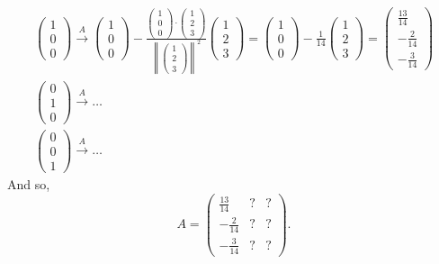 \documentclass[12pt]{article}
\newcommand{\norm}[1]{\left\lVert#1\right\rVert}
\begin{document}
\begin{gather*}
	\begin{pmatrix} 1 \\ 0 \\ 0 \end{pmatrix}
	\overset{A}{\longrightarrow}
	\begin{pmatrix} 1 \\ 0 \\ 0 \end{pmatrix}
	-
	\frac{
		\begin{pmatrix} 1 \\ 0 \\ 0 \end{pmatrix}
		\cdot
		\begin{pmatrix} 1 \\ 2 \\ 3 \end{pmatrix}
	}{
		\norm{\begin{pmatrix} 1 \\ 2 \\ 3 \end{pmatrix}}^2
	}
	\begin{pmatrix} 1 \\ 2 \\ 3 \end{pmatrix}
	=
	\begin{pmatrix} 1 \\ 0 \\ 0 \end{pmatrix}
	-
	\frac{1}{14}
	\begin{pmatrix} 1 \\ 2 \\ 3 \end{pmatrix}
	=
	\begin{pmatrix}
		\frac{13}{14} \\ -\frac{2}{14} \\ -\frac{3}{14}
	\end{pmatrix}
	\\
	\begin{pmatrix} 0 \\ 1 \\ 0 \end{pmatrix}
	\overset{A}{\longrightarrow}
	\ldots
	\\
	\begin{pmatrix} 0 \\ 0 \\ 1 \end{pmatrix}
	\overset{A}{\longrightarrow}
	\ldots
\end{gather*}
And so,
\begin{equation*}
	\boxed{
		A =
		\begin{pmatrix}
			\frac{13}{14} & ? & ? \\
			-\frac{2}{14} & ? & ? \\
			-\frac{3}{14} & ? & ?
		\end{pmatrix}
	}
	.
\end{equation*}
\end{document}
